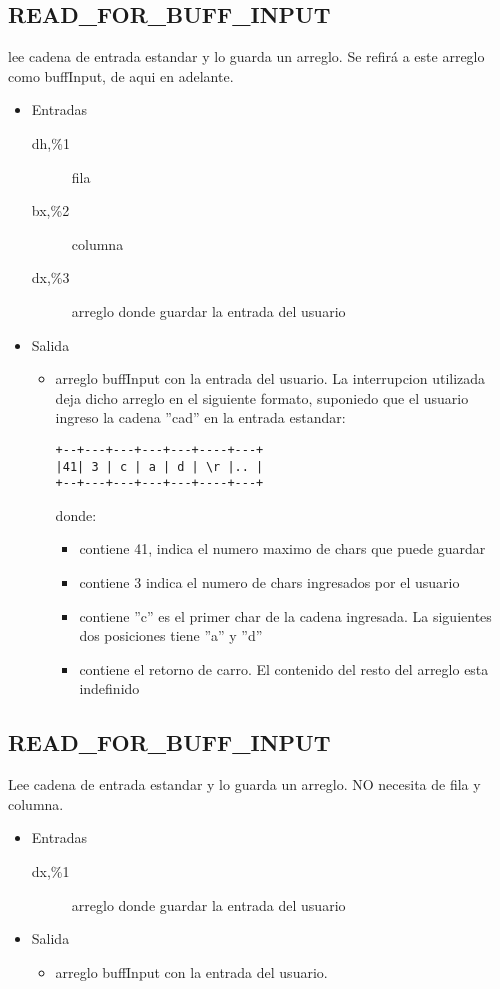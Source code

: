 \subsection{READ\_FOR\_BUFF\_INPUT}
\label{sec-1-13}
lee cadena de entrada estandar y lo guarda un arreglo. Se
refirá a este arreglo como buffInput, de aqui en adelante. 
\begin{itemize}
\item Entradas
\begin{description}
\item[dh,\%1] fila
\item[bx,\%2] columna
\item[dx,\%3] arreglo donde guardar la entrada del usuario
\end{description}
\item Salida
\begin{itemize}
\item arreglo buffInput con la entrada del usuario. La
interrupcion utilizada deja dicho arreglo en el
siguiente formato, suponiedo que el usuario ingreso
la cadena ''cad'' en la entrada estandar:
\begin{verbatim}
+--+---+---+---+---+----+---+
|41| 3 | c | a | d | \r |.. |
+--+---+---+---+---+----+---+
\end{verbatim}

donde:
\begin{itemize}
\item\relax [buffInput] contiene 41, indica el numero maximo de
chars que puede guardar
\item\relax [buffInput+1] contiene 3 indica el numero de chars
ingresados por el usuario
\item\relax [buffInput+2] contiene ''c'' es el primer char de la
cadena ingresada. La siguientes dos posiciones tiene
''a'' y ''d''
\item\relax [buffInput+5] contiene el retorno de carro. El
contenido del resto del arreglo esta indefinido
\end{itemize}
\end{itemize}
\end{itemize}

\subsection{READ\_FOR\_BUFF\_INPUT}
\label{sec-1-14}
Lee cadena de entrada estandar y lo guarda un arreglo. NO
necesita de fila y columna.
\begin{itemize}
\item Entradas
\begin{description}
\item[dx,\%1] arreglo donde guardar la entrada del usuario
\end{description}
\item Salida
\begin{itemize}
\item arreglo buffInput con la entrada del usuario.
\end{itemize}
\end{itemize}

